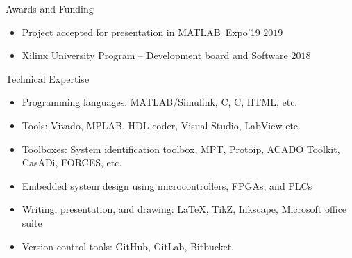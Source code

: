\documentclass[11pt]{resume}
\newcommand{\mt}{\textsc{MATLAB}}
\newcommand\cpp{C\nolinebreak[4]\hspace{-.05em}\raisebox{.4ex}{\relsize{-3}{\textbf{++}}}}
\newcommand\cp{C\nolinebreak[4]\hspace{-.05em}\raisebox{.4ex}{\relsize{-3}{\textbf{}}}}
\newenvironment{outerlist}[1][\enskip\textbullet]%
{\begin{itemize}[#1,leftmargin=*]}{\end{itemize}%
	\vspace{-.5\baselineskip}}
\begin{document}
\begin{rSection}{Awards and Funding}
\begin{outerlist}
	\item Project accepted for presentation in \mt ~Expo'19 \hfill $ 2019 $
	\item Xilinx University Program  -- Development board and Software \hfill $ 2018 $
\end{outerlist}
\end{rSection}
\begin{rSection}{Technical Expertise}
\begin{outerlist}
    \item Programming languages: \mt/Simulink, \cp, \cpp, HTML, etc.
	\item Tools: Vivado, MPLAB,  HDL coder, Visual Studio, LabView etc.
	\item Toolboxes: System identification toolbox, MPT, Protoip, ACADO Toolkit, CasADi, FORCES, etc.
	\item Embedded system design using microcontrollers, FPGAs, and PLCs
	\item Writing, presentation, and drawing: \LaTeX, TikZ, Inkscape, Microsoft office suite
	\item Version control tools: GitHub, GitLab, Bitbucket.
\end{outerlist}
\end{rSection}
\end{document}
